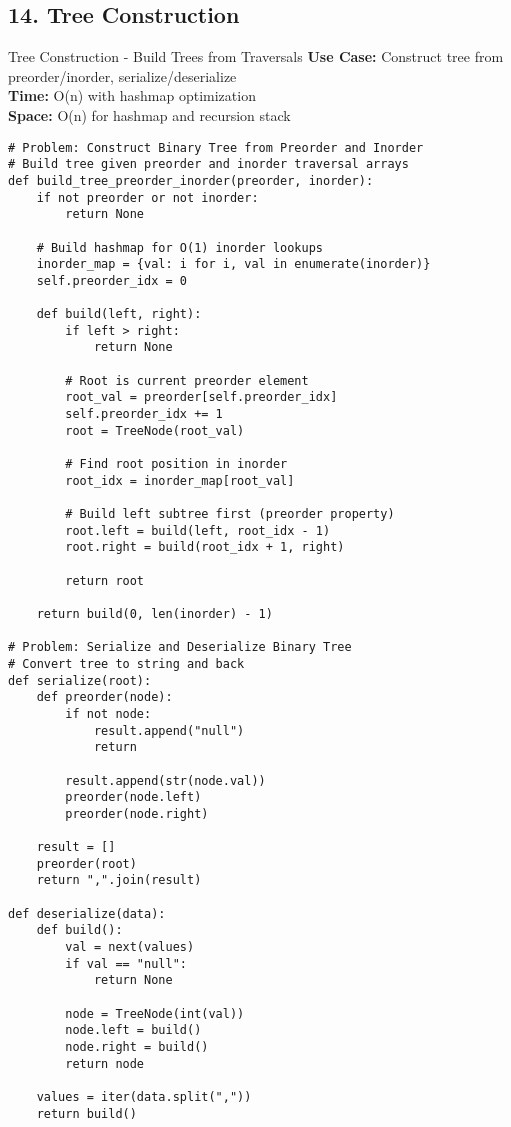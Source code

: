 \documentclass[10pt,a4paper]{article}
\begin{document}
\subsection{14. Tree Construction}

\begin{patternbox}{Tree Construction - Build Trees from Traversals}
\textbf{Use Case:} Construct tree from preorder/inorder, serialize/deserialize\\
\textbf{Time:} O(n) with hashmap optimization\\
\textbf{Space:} O(n) for hashmap and recursion stack
\end{patternbox}

\begin{lstlisting}
# Problem: Construct Binary Tree from Preorder and Inorder
# Build tree given preorder and inorder traversal arrays
def build_tree_preorder_inorder(preorder, inorder):
    if not preorder or not inorder:
        return None

    # Build hashmap for O(1) inorder lookups
    inorder_map = {val: i for i, val in enumerate(inorder)}
    self.preorder_idx = 0

    def build(left, right):
        if left > right:
            return None

        # Root is current preorder element
        root_val = preorder[self.preorder_idx]
        self.preorder_idx += 1
        root = TreeNode(root_val)

        # Find root position in inorder
        root_idx = inorder_map[root_val]

        # Build left subtree first (preorder property)
        root.left = build(left, root_idx - 1)
        root.right = build(root_idx + 1, right)

        return root

    return build(0, len(inorder) - 1)

# Problem: Serialize and Deserialize Binary Tree
# Convert tree to string and back
def serialize(root):
    def preorder(node):
        if not node:
            result.append("null")
            return

        result.append(str(node.val))
        preorder(node.left)
        preorder(node.right)

    result = []
    preorder(root)
    return ",".join(result)

def deserialize(data):
    def build():
        val = next(values)
        if val == "null":
            return None

        node = TreeNode(int(val))
        node.left = build()
        node.right = build()
        return node

    values = iter(data.split(","))
    return build()
\end{lstlisting}
\end{document}

